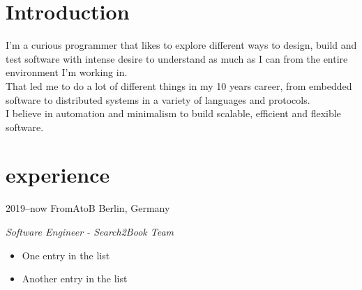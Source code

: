 \documentclass[]{friggeri-cv} %
\begin{document}
\section{Introduction}

\begin{entrylist}
\entry
{}
{}
{}
{
I'm a curious programmer that likes to explore different ways to design, build and test software
with intense desire to understand as much as I can from the entire environment I'm working in.\\

That led me to do a lot of different things in my 10 years career, from embedded
software to distributed systems in a variety of languages and protocols.\\

I believe in automation and minimalism to build scalable, efficient and flexible software.
}
\end{entrylist}


\section{experience}

\begin{entrylist}
\entry
{2019--now}
{FromAtoB}
{Berlin, Germany}
{\emph{Software Engineer - Search2Book Team} \\

\begin{itemize}
  \item One entry in the list
  \item Another entry in the list
\end{itemize}

}
\end{entrylist}
\end{document}
